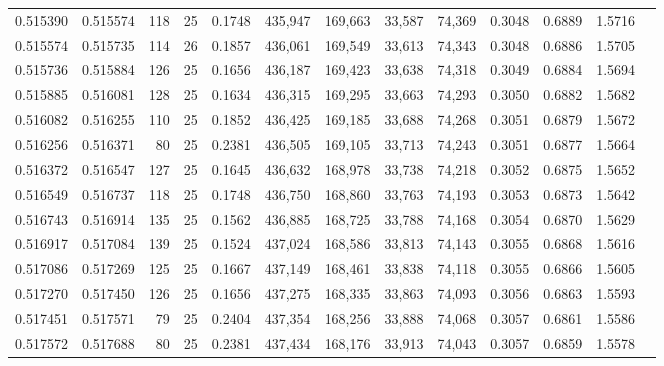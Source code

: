 \begin{tabular}{rrrrrrrrrrrrr}
0.515390 & 0.515574 &   118 &  25 &                                     0.1748 & 435,947 & 169,663 &  33,587 &  74,369 & 0.3048 & 0.6889 & 1.5716 \\
0.515574 & 0.515735 &   114 &  26 &                                     0.1857 & 436,061 & 169,549 &  33,613 &  74,343 & 0.3048 & 0.6886 & 1.5705 \\
0.515736 & 0.515884 &   126 &  25 &                                     0.1656 & 436,187 & 169,423 &  33,638 &  74,318 & 0.3049 & 0.6884 & 1.5694 \\
0.515885 & 0.516081 &   128 &  25 &                                     0.1634 & 436,315 & 169,295 &  33,663 &  74,293 & 0.3050 & 0.6882 & 1.5682 \\
0.516082 & 0.516255 &   110 &  25 &                                     0.1852 & 436,425 & 169,185 &  33,688 &  74,268 & 0.3051 & 0.6879 & 1.5672 \\
0.516256 & 0.516371 &    80 &  25 &                                     0.2381 & 436,505 & 169,105 &  33,713 &  74,243 & 0.3051 & 0.6877 & 1.5664 \\
0.516372 & 0.516547 &   127 &  25 &                                     0.1645 & 436,632 & 168,978 &  33,738 &  74,218 & 0.3052 & 0.6875 & 1.5652 \\
0.516549 & 0.516737 &   118 &  25 &                                     0.1748 & 436,750 & 168,860 &  33,763 &  74,193 & 0.3053 & 0.6873 & 1.5642 \\
0.516743 & 0.516914 &   135 &  25 &                                     0.1562 & 436,885 & 168,725 &  33,788 &  74,168 & 0.3054 & 0.6870 & 1.5629 \\
0.516917 & 0.517084 &   139 &  25 &                                     0.1524 & 437,024 & 168,586 &  33,813 &  74,143 & 0.3055 & 0.6868 & 1.5616 \\
0.517086 & 0.517269 &   125 &  25 &                                     0.1667 & 437,149 & 168,461 &  33,838 &  74,118 & 0.3055 & 0.6866 & 1.5605 \\
0.517270 & 0.517450 &   126 &  25 &                                     0.1656 & 437,275 & 168,335 &  33,863 &  74,093 & 0.3056 & 0.6863 & 1.5593 \\
0.517451 & 0.517571 &    79 &  25 &                                     0.2404 & 437,354 & 168,256 &  33,888 &  74,068 & 0.3057 & 0.6861 & 1.5586 \\
0.517572 & 0.517688 &    80 &  25 &                                     0.2381 & 437,434 & 168,176 &  33,913 &  74,043 & 0.3057 & 0.6859 & 1.5578 \\

\end{tabular}
